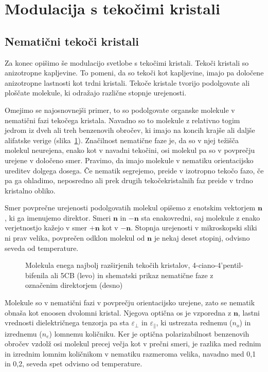\section{Modulacija s tekočimi kristali}

\subsection*{Nematični tekoči kristali}
Za konec opišimo še modulacijo svetlobe s tekočimi kristali. 
Tekoči kristali so anizotropne kapljevine. To pomeni, da so tekoči kot 
kapljevine, imajo pa določene anizotropne lastnosti kot trdni kristali. 
Tekoče kristale tvorijo podolgovate ali ploščate molekule, 
ki odražajo različne stopnje urejenosti. 

Omejimo se najosnovnejši
primer, to so podolgovate organske molekule v nematični fazi tekočega kristala. 
Navadno so to molekule z relativno togim jedrom iz
dveh ali treh benzenovih obročev, ki imajo na koncih krajše ali daljše
alifatske verige (slika~\ref{fig:5CB}). Značilnost nematične faze je, da
so v njej težišča molekul neurejena, enako kot v navadni tekočini, 
osi molekul pa so v povprečju urejene v določeno smer. Pravimo, da imajo molekule
v nematiku orientacijsko ureditev dolgega dosega. Če nematik segrejemo,
preide v izotropno tekočo fazo, če pa ga ohladimo, neposredno ali prek drugih
tekočekristalnih faz preide v trdno kristalno obliko. 

Smer povprečne urejenosti podolgovatih molekul opišemo z enotskim vektorjem 
$\mathbf{n}$, ki ga imenujemo direktor. Smeri $\mathbf{n}$ in $-\mathbf{n}$ sta 
enakovredni, saj molekule z enako verjetnostjo kažejo v smer $+\mathbf{n}$ kot 
v $-\mathbf{n}$. Stopnja urejenosti v mikroskopski sliki ni prav velika, povprečen
odklon molekul od $\mathbf{n}$ je nekaj deset stopinj, odvisno seveda od temperature.
\begin{figure}[h]
\centering
\def\svgwidth{30truemm} 
\qquad\qquad
\def\svgwidth{50truemm} 

\caption{Molekula enega najbolj razširjenih tekočih kristalov, 4-ciano-4'pentil-bifenila 
ali 5CB (levo) in shematski prikaz nematične faze z označenim direktorjem (desno)}
\label{fig:5CB}
\end{figure}

Molekule so v nematični fazi v povprečju orientacijsko urejene, zato se nematik
obnaša kot enoosen dvolomni kristal. Njegova optična os je vzporedna 
z $\mathbf{n}$, lastni vrednosti dielektričnega tenzorja pa sta $\varepsilon_\bot$ in
$\varepsilon_{\parallel}$, ki ustrezata rednemu ($n_o$) in izrednemu ($n_e$) 
lomnemu količniku.  
Ker je optična polarizabilnost benzenovih obročev vzdolž osi molekul precej večja kot
v prečni smeri, je razlika med rednim in izrednim lomnim količnikom v nematiku razmeroma 
velika, navadno med 0,1 in 0,2, seveda spet odvisno od temperature.

